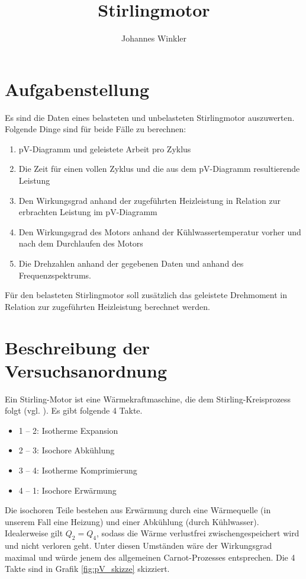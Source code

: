 \documentclass{article}
\title{Stirlingmotor}
\author{Johannes Winkler}
\date{}
\begin{document}

 
 
 
\pagestyle{fancy}


\tableofcontents

\newpage


\section{Aufgabenstellung}

Es sind die Daten eines belasteten und unbelasteten Stirlingmotor auszuwerten. Folgende Dinge sind für beide Fälle zu berechnen:
\begin{enumerate}
\item pV-Diagramm und geleistete Arbeit pro Zyklus
\item Die Zeit für einen vollen Zyklus und die aus dem pV-Diagramm resultierende Leistung
\item Den Wirkungsgrad anhand der zugeführten Heizleistung in Relation zur erbrachten Leistung im pV-Diagramm
\item Den Wirkungsgrad des Motors anhand der Kühlwassertemperatur vorher und nach dem Durchlaufen des Motors
\item Die Drehzahlen anhand der gegebenen Daten und anhand des Frequenzspektrums.
\end{enumerate}

Für den belasteten Stirlingmotor soll zusätzlich das geleistete Drehmoment in Relation zur zugeführten Heizleistung berechnet werden.

\section{Beschreibung der Versuchsanordnung}

Ein Stirling-Motor ist eine Wärmekraftmaschine, die dem Stirling-Kreisprozess folgt (vgl. \cite{demtr1}). Es gibt folgende 4 Takte. 
\begin{itemize}
\item 1 -- 2: Isotherme Expansion
\item 2 -- 3: Isochore Abkühlung
\item 3 -- 4: Isotherme Komprimierung
\item 4 -- 1: Isochore Erwärmung
\end{itemize}

Die isochoren Teile bestehen aus Erwärmung durch eine Wärmequelle (in unserem Fall eine Heizung) und einer Abkühlung (durch Kühlwasser). Idealerweise gilt $Q_2=Q_4$, sodass die Wärme verlustfrei zwischengespeichert wird und nicht verloren geht. Unter diesen Umständen wäre der Wirkungsgrad maximal und würde jenem des allgemeinen Carnot-Prozesses entsprechen. Die 4 Takte sind in Grafik \ref{fig:pV_skizze} skizziert.
\end{document}

